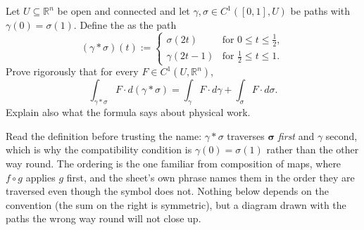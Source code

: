 \begin{exercise}
\label{ex:path_concatenation_work}
Let $U \subseteq \mathbb{R}^n$ be open and connected and let $\gamma,\sigma \in C^1([0,1],U)$ be
paths with $\gamma(0) = \sigma(1)$. Define the 
 as the path
\[(\gamma * \sigma)(t) := \begin{cases}
  \sigma(2t) & \text{for } 0 \le t \le \tfrac12, \\
  \gamma(2t-1) & \text{for } \tfrac12 \le t \le 1.
\end{cases}\]
Prove rigorously that for every $F \in C^1(U,\mathbb{R}^n)$,
\[\int_{\gamma*\sigma} F \cdot d(\gamma*\sigma) = \int_\gamma F \cdot d\gamma
  + \int_\sigma F \cdot d\sigma.\]
Explain also what the formula says about physical work.
\end{exercise}

\begin{ainote}
Read the definition before trusting the name: $\gamma * \sigma$ traverses $\boldsymbol{\sigma}$
\emph{first} and $\gamma$ second, which is why the compatibility condition is
$\gamma(0) = \sigma(1)$ rather than the other way round. The ordering is the one familiar from
composition of maps, where $f \circ g$ applies $g$ first, and the sheet's own phrase
 names them in the order they are traversed even though
the symbol does not. Nothing below depends on the convention (the sum on the right is symmetric),
but a diagram drawn with the paths the wrong way round will not close up.
\end{ainote}

